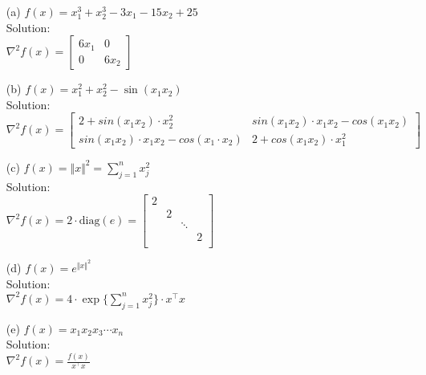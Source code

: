 \documentclass[12pt]{amsart}
\newcommand{\norm}[1]{\Vert #1 \Vert}
\newcommand{\grad}{\nabla}
\begin{document}
\begin{enumerate}
\begin{enumerate}
\item[(a)] $f(x)=x_1^3+x_2^3-3x_1-15x_2+25 $\\

\noindent
Solution:\\
$\grad^2 f(x) = 
\begin{bmatrix}
6x_1 & 0\\
0 	 & 6x_2
\end{bmatrix}
$ \\

\item[(b)] $f(x)=x_1^2+x_2^2-\sin(x_1x_2)$ \\

\noindent
Solution:\\
$\grad^2 f(x)= 
\begin{bmatrix}
2 + sin(x_1 x_2) \cdot x_2^2 & sin(x_1 x_2) \cdot x_1 x_2 - cos(x_1 x_2)\\
sin(x_1 x_2) \cdot x_1 x_2 - cos(x_1 \cdot x_2) & 2 + cos(x_1 x_2) \cdot x_1^2
\end{bmatrix}
$ \\

\item[(c)] $f(x)=\norm{x}^2=\sum_{j=1}^nx_j^2$\\

\noindent
Solution:\\
$\grad^2 f(x) = 2 \cdot \text{diag}(e) = 
\begin{bmatrix}
2 & & & \\
& 2 & & \\
& & \ddots & \\
& & & 2\\
\end{bmatrix} $\\

\item[(d)] $f(x)=\displaystyle e^{\norm{x}^2}$\\

\noindent
Solution:\\
$\grad^2 f(x) =  4 \cdot \exp\{\displaystyle \sum_{j=1}^n x_j^2 \} \cdot x^\top x
$\\


\item[(e)] $f(x)=x_1x_2x_3\cdots x_n $ \\

\noindent
Solution:\\
$\displaystyle \grad^2 f(x) = \frac{f(x)}{x^\top x}
$\\


\end{enumerate}
\end{enumerate}
\end{document}
